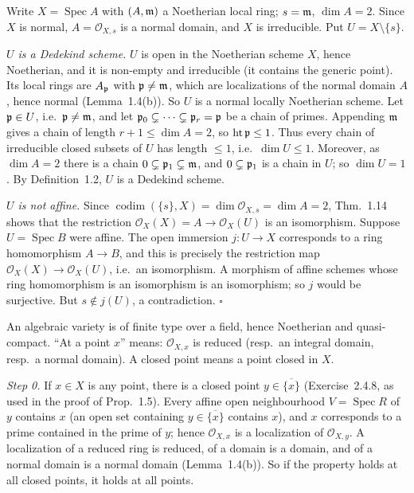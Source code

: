 \documentclass[11pt]{article}
\begin{document}
\pf
Write $X=\operatorname{Spec}A$ with $(A,\mathfrak m)$ a Noetherian local ring; $s=\mathfrak m$, $\dim A=2$. Since $X$ is normal, $A=\mathcal O_{X,s}$ is a normal domain, and $X$ is irreducible. Put $U=X\setminus\{s\}$.

\emph{$U$ is a Dedekind scheme.} $U$ is open in the Noetherian scheme $X$, hence Noetherian, and it is non-empty and irreducible (it contains the generic point). Its local rings are $A_\mathfrak p$ with $\mathfrak p\neq\mathfrak m$, which are localizations of the normal domain $A$, hence normal (Lemma~1.4(b)). So $U$ is a normal locally Noetherian scheme. Let $\mathfrak p\in U$, i.e.\ $\mathfrak p\neq\mathfrak m$, and let $\mathfrak p_0\subsetneq\dots\subsetneq\mathfrak p_r=\mathfrak p$ be a chain of primes. Appending $\mathfrak m$ gives a chain of length $r+1\le\dim A=2$, so $\operatorname{ht}\mathfrak p\le1$. Thus every chain of irreducible closed subsets of $U$ has length $\le1$, i.e.\ $\dim U\le1$. Moreover, as $\dim A=2$ there is a chain $0\subsetneq\mathfrak p_1\subsetneq\mathfrak m$, and $0\subsetneq\mathfrak p_1$ is a chain in $U$; so $\dim U=1$. By Definition~1.2, $U$ is a Dedekind scheme.

\emph{$U$ is not affine.} Since $\operatorname{codim}(\{s\},X)=\dim\mathcal O_{X,s}=\dim A=2$, Thm.~1.14 shows that the restriction $\mathcal O_X(X)=A\to\mathcal O_X(U)$ is an isomorphism. Suppose $U=\operatorname{Spec}B$ were affine. The open immersion $j:U\to X$ corresponds to a ring homomorphism $A\to B$, and this is precisely the restriction map $\mathcal O_X(X)\to\mathcal O_X(U)$, i.e.\ an isomorphism. A morphism of affine schemes whose ring homomorphism is an isomorphism is an isomorphism; so $j$ would be surjective. But $s\notin j(U)$, a contradiction. \hfill$\square$

\pf
An algebraic variety is of finite type over a field, hence Noetherian and quasi-compact. ``At a point $x$'' means: $\mathcal O_{X,x}$ is reduced (resp.\ an integral domain, resp.\ a normal domain). A closed point means a point closed in $X$.

\emph{Step 0.} If $x\in X$ is any point, there is a closed point $y\in\overline{\{x\}}$ (Exercise~2.4.8, as used in the proof of Prop.~1.5). Every affine open neighbourhood $V=\operatorname{Spec}R$ of $y$ contains $x$ (an open set containing $y\in\overline{\{x\}}$ contains $x$), and $x$ corresponds to a prime contained in the prime of $y$; hence $\mathcal O_{X,x}$ is a localization of $\mathcal O_{X,y}$. A localization of a reduced ring is reduced, of a domain is a domain, and of a normal domain is a normal domain (Lemma~1.4(b)). So if the property holds at all closed points, it holds at all points.
\end{document}
